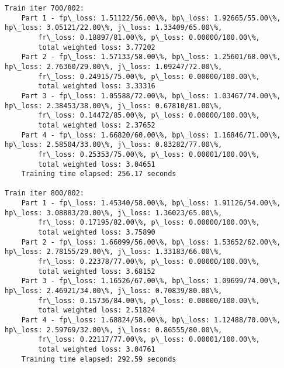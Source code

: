 \documentclass[11pt]{article}
\begin{document}
\begin{Verbatim}[commandchars=\\\{\}]
Train iter 700/802:
	Part 1 - fp\_loss: 1.51122/56.00\%, bp\_loss: 1.92665/55.00\%, hp\_loss: 3.05121/22.00\%, j\_loss: 1.33409/65.00\%, 
		fr\_loss: 0.18897/81.00\%, p\_loss: 0.00000/100.00\%, 
		total weighted loss: 3.77202
	Part 2 - fp\_loss: 1.57133/58.00\%, bp\_loss: 1.25601/68.00\%, hp\_loss: 2.76360/29.00\%, j\_loss: 1.09247/72.00\%, 
		fr\_loss: 0.24915/75.00\%, p\_loss: 0.00000/100.00\%, 
		total weighted loss: 3.33316
	Part 3 - fp\_loss: 1.05588/72.00\%, bp\_loss: 1.03467/74.00\%, hp\_loss: 2.38453/38.00\%, j\_loss: 0.67810/81.00\%, 
		fr\_loss: 0.14472/85.00\%, p\_loss: 0.00000/100.00\%, 
		total weighted loss: 2.37652
	Part 4 - fp\_loss: 1.66820/60.00\%, bp\_loss: 1.16846/71.00\%, hp\_loss: 2.58504/33.00\%, j\_loss: 0.83282/77.00\%, 
		fr\_loss: 0.25353/75.00\%, p\_loss: 0.00001/100.00\%, 
		total weighted loss: 3.04651
	Training time elapsed: 256.17 seconds

Train iter 800/802:
	Part 1 - fp\_loss: 1.45340/58.00\%, bp\_loss: 1.91126/54.00\%, hp\_loss: 3.08883/20.00\%, j\_loss: 1.36023/65.00\%, 
		fr\_loss: 0.17195/82.00\%, p\_loss: 0.00000/100.00\%, 
		total weighted loss: 3.75890
	Part 2 - fp\_loss: 1.66099/56.00\%, bp\_loss: 1.53652/62.00\%, hp\_loss: 2.78155/29.00\%, j\_loss: 1.33183/66.00\%, 
		fr\_loss: 0.22378/77.00\%, p\_loss: 0.00000/100.00\%, 
		total weighted loss: 3.68152
	Part 3 - fp\_loss: 1.16526/67.00\%, bp\_loss: 1.09699/74.00\%, hp\_loss: 2.46921/34.00\%, j\_loss: 0.70839/80.00\%, 
		fr\_loss: 0.15736/84.00\%, p\_loss: 0.00000/100.00\%, 
		total weighted loss: 2.51824
	Part 4 - fp\_loss: 1.68824/58.00\%, bp\_loss: 1.12488/70.00\%, hp\_loss: 2.59769/32.00\%, j\_loss: 0.86555/80.00\%, 
		fr\_loss: 0.22117/77.00\%, p\_loss: 0.00001/100.00\%, 
		total weighted loss: 3.04761
	Training time elapsed: 292.59 seconds


\end{Verbatim}
\end{document}

